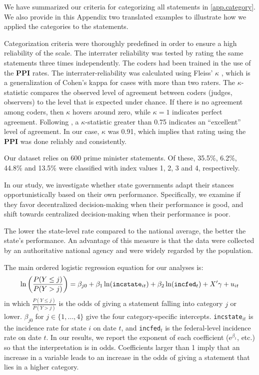 \documentclass[authoryear,12pt, 3p]{elsarticle} %
\theoremstyle{break}
\begin{document}
We have summarized our criteria for categorizing all statements in \ref{app.category}. We also provide in this Appendix two translated examples to illustrate how we applied the categories to the statements.

Categorization criteria were thoroughly predefined in order to ensure a high reliability of the scale. The interrater reliability was tested by rating the same statements three times independently. The coders had been trained in the use of the \textbf{PPI} rates. The interrater-reliability was calculated using Fleiss’ $\kappa$ \citep[][Ch.~18]{Fleiss2003}, which is a generalization of Cohen’s kappa for cases with more than two raters. The $\kappa$-statistic compares the observed level of agreement between coders (judges, observers) to the level that is expected under chance. If there is no agreement among coders, then ${\kappa}$ hovers around zero, while ${\kappa}=1$ indicates perfect agreement. Following \cite{Fleiss2003}, a $\kappa$-statistic greater than 0.75 indicates an ``excellent'' level of agreement. In our case, $\kappa$ was 0.91, which implies that rating using the \textbf{PPI} was done reliably and consistently.

Our dataset relies on 600 prime minister statements. Of these, 35.5\%, 6.2\%, 44.8\% and 13.5\% were classified with index values 1, 2, 3 and 4, respectively.

In our study, we investigate whether state governments adapt their stances opportunistically based on their own performance. Specifically, we examine if they favor decentralized decision-making when their performance is good, and shift towards centralized decision-making when their performance is poor. 

The lower the state-level rate compared to the national average, the better the state's performance. An advantage of this measure is that the data were collected by an authoritative national agency and were widely regarded by the population.

The main ordered logistic regression equation for our analyses is:
\begin{equation} \label{eq.regression01}
	\ln \left( \frac{P(Y \leq j)}{P(Y > j)} \right) = \beta_{j0} + \beta_1 \ln(\text{\texttt{incstate}}_{it}) + \beta_2 \ln(\text{\texttt{incfed}}_{t}) + X' \gamma + u_{it} 
\end{equation}
in which $\frac{P(Y \leq j)}{P(Y > j)}$ is the odds of giving a statement falling into category $j$ or lower. $\beta_{j0}$ for $j \in \{1,\ldots,4\}$ give the four category-specific intercepts. \texttt{incstate}$_{it}$ is the incidence rate for state $i$ on date $t$, and \texttt{incfed}$_{t}$ is the federal-level incidence rate on date $t$. In our results, we report the exponent of each coefficient ($\mathrm{e}^{\beta_1}$, etc.) so that the interpretation is in odds. Coefficients larger than 1 imply that an increase in a variable leads to an increase in the odds of giving a statement that lies in a higher category. 
\end{document}
